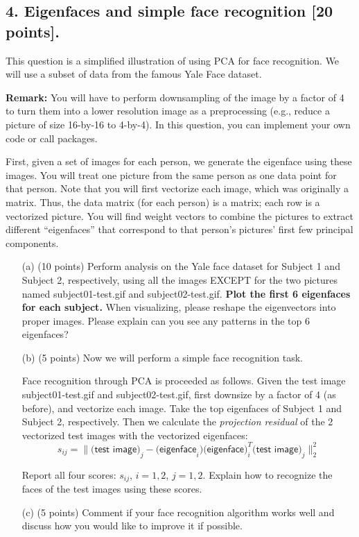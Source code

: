 \documentclass[twoside,10pt]{article}
\begin{document}
\clearpage

\subsection*{4. Eigenfaces and simple face recognition [20 points].}

This question is a simplified illustration of using PCA for face recognition. We will use a subset of data from the famous Yale Face dataset. 

\vspace{.1in}
\noindent
{\bf Remark:} You will have to perform downsampling of the image by a factor of 4 to turn them into a lower resolution image as a preprocessing (e.g., reduce a picture of size 16-by-16 to 4-by-4). In this question, you can implement your own code or call packages. 

First, given a set of images for each person, we generate the eigenface using these images. You will treat one picture from the same person as one data point for that person. Note that you will first vectorize each image, which was originally a matrix. Thus, the data matrix (for each person) is a matrix; each row is a vectorized picture. You will find weight vectors to combine the pictures to extract different ``eigenfaces'' that correspond to that person's pictures' first few principal components. 


\begin{enumerate}

\item[(a)] (10 points) Perform analysis on the Yale face dataset for Subject 1 and Subject 2, respectively, using all the images EXCEPT for the two pictures named \textsf{subject01-test.gif} and \textsf{subject02-test.gif}. {\bf Plot the first 6 eigenfaces for each subject.} When visualizing, please reshape the eigenvectors into proper images. Please explain can you see any patterns in the top 6 eigenfaces?

\item[(b)] (5 points) Now we will perform a simple face recognition task. 

Face recognition through PCA is proceeded as follows. Given the test image \textsf{subject01-test.gif} and \textsf{subject02-test.gif}, first downsize by a factor of 4 (as before), and vectorize each image. Take the top eigenfaces of Subject 1 and Subject 2, respectively. Then we calculate the {\it projection residual} of the 2 vectorized test images with the vectorized eigenfaces:
\[s_{ij} = \|\textsf{(test image)}_j - \textsf{(eigenface}_i)\textsf{(eigenface})_i^T \textsf{(test image)}_j\|_2^2\]

Report all four scores: $s_{ij}$, $i = 1, 2$, $j = 1, 2.$ Explain how to recognize the faces of the test images using these scores. 

\item[(c)] (5 points) Comment if your face recognition algorithm works well and discuss how you would like to improve it if possible.

\end{enumerate}
\end{document}

